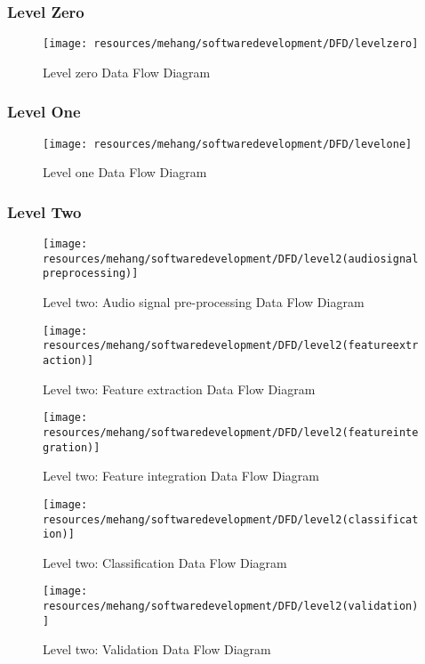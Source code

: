\subsubsection{Level Zero}
\begin{figure}[h!]
        \centering
        \texttt{[image: resources/mehang/softwaredevelopment/DFD/levelzero]}
        \caption{Level zero Data Flow Diagram}
        \label{fig:contextlevel}
\end{figure}
\newpage
\subsubsection{Level One}
\begin{figure}[h!]
        \texttt{[image: resources/mehang/softwaredevelopment/DFD/levelone]}
        \caption{Level one Data Flow Diagram}
        \label{fig:level1b}
\end{figure}
\subsubsection{Level Two}
\vspace{20mm}
\begin{figure}[h!]
        \centering
        \texttt{[image: resources/mehang/softwaredevelopment/DFD/level2(audiosignalpreprocessing)]}
        \caption{Level two: Audio signal pre-processing Data Flow Diagram}
        \label{fig:pre-processing}
\end{figure}
\vspace{20mm}
\begin{figure}[h!]
        \centering
        \texttt{[image: resources/mehang/softwaredevelopment/DFD/level2(featureextraction)]}
        \caption{Level two: Feature extraction Data Flow Diagram}
\end{figure}
\vspace{90mm}
\begin{figure}[h!]
        \centering
        \texttt{[image: resources/mehang/softwaredevelopment/DFD/level2(featureintegration)]}
        \caption{Level two: Feature integration Data Flow Diagram}
\end{figure}
\vspace{90mm}
\begin{figure}[h!]
        \centering
        \texttt{[image: resources/mehang/softwaredevelopment/DFD/level2(classification)]}
        \caption{Level two: Classification Data Flow Diagram}
        \label{fig:classifier}
\end{figure}
\begin{figure}[h!]
        \centering
        \texttt{[image: resources/mehang/softwaredevelopment/DFD/level2(validation)]}
        \caption{Level two: Validation Data Flow Diagram}
        \label{fig:validation}
\end{figure}
\vspace{50mm}
\newpage
\newpage
\newpage
\newpage
\newpage
